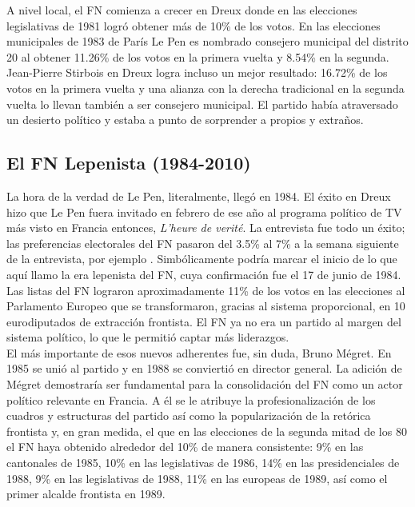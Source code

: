A nivel local, el FN comienza a crecer en Dreux donde en las elecciones legislativas de 1981 logró obtener más de 10\% de los votos. En las elecciones municipales de 1983 de París Le Pen es nombrado consejero municipal del distrito 20 al obtener 11.26\% de los votos en la primera vuelta y 8.54\% en la segunda. Jean-Pierre Stirbois en Dreux logra incluso un mejor resultado: 16.72\% de los votos en la primera vuelta y una alianza con la derecha tradicional en la segunda vuelta lo llevan también a ser consejero municipal. El partido había atraversado un desierto político y estaba a punto de sorprender a propios y extraños.\\

\subsection{El FN Lepenista (1984-2010)}

La hora de la verdad de Le Pen, literalmente, llegó en 1984. El éxito en Dreux hizo que Le Pen fuera invitado en febrero de ese año al programa político de TV más visto en Francia entonces, \textit{L'heure de verité}. La entrevista fue todo un éxito; las preferencias electorales del FN pasaron del 3.5\% al 7\% a la semana siguiente de la entrevista, por ejemplo \parencite{Stockemer17}. Simbólicamente podría marcar el inicio de lo que aquí llamo la era lepenista del FN, cuya confirmación fue el 17 de junio de 1984. Las listas del FN lograron aproximadamente 11\% de los votos en las elecciones al Parlamento Europeo que se transformaron, gracias al sistema proporcional, en 10 eurodiputados de extracción frontista. El FN ya no era un partido al margen del sistema político, lo que le permitió captar más liderazgos.\\ 

El más importante de esos nuevos adherentes fue, sin duda, Bruno Mégret. En 1985 se unió al partido y en 1988 se conviertió en director general. La adición de Mégret demostraría ser fundamental para la consolidación del FN como un actor político relevante en Francia. A él se le atribuye la profesionalización de los cuadros y estructuras del partido así como la popularización de la retórica frontista y, en gran medida, el que en las elecciones de la segunda mitad de los 80 el FN haya obtenido alrededor del 10\% de manera consistente: 9\% en las cantonales de 1985, 10\% en las legislativas de 1986, 14\% en las presidenciales de 1988, 9\% en las legislativas de 1988, 11\% en las europeas de 1989, así como el primer alcalde frontista en 1989.\\ 


